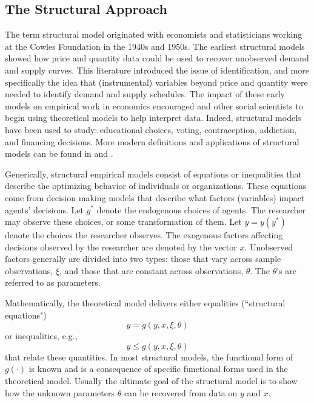 \subsection{The Structural Approach}

The term structural model originated with economists and statisticians working at the Cowles Foundation in the 1940s and 1950s.
The earliest structural models showed how price and quantity data could be used to recover unobserved demand and supply curves. 
This literature introduced the issue of identification, and more specifically the idea that (instrumental) variables beyond price and quantity were needed to identify demand and supply schedules. 
The impact of these early models on empirical work in economics encouraged and other social scientists to begin using theoretical models to help interpret data.
Indeed, structural models have been used to study: educational choices, voting, 
contraception, addiction, and financing decisions. 
More modern definitions and applications 
of structural models can be found in \citet{Reiss:2007ej} and \citet{Reiss:2011go}.

Generically, structural empirical models consist of equations or inequalities that describe the optimizing behavior of individuals or organizations. 
These equations come from decision making models that describe what factors (variables) impact agents' decisions.
Let $y^*$ denote the endogenous choices of agents. 
The researcher may observe these choices, or some transformation of them.
Let $y=y(y^*)$ denote the choices the researcher observes. 
The exogenous factors affecting decisions observed by the researcher are denoted by the vector $x$. 
Unobserved factors generally
are divided into two types: those that vary across sample observations, $\xi$, and
those that are constant across observations, $\theta$. 
The $\theta$'s are referred to as parameters.

Mathematically, the theoretical model delivers either equalities (``structural equations")
$$  y = g(y, x,\xi ,\theta)$$ 
or inequalities, e.g.,
$$  y \le g(y, x,\xi ,\theta)$$
that relate these quantities.
In most structural models, the functional form of $g(\cdot)$ is known and is a consequence of specific functional forms used in the theoretical model. 
Usually the ultimate goal of the structural model is to show how the unknown parameters 
$\theta$ can be recovered from data on $y$ and $x$. 

